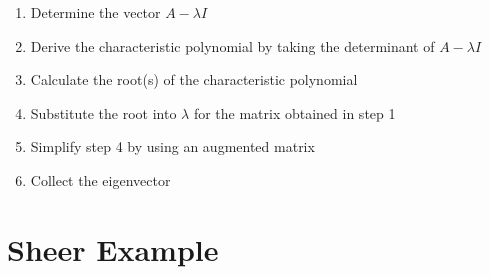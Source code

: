 \documentclass{article}
\begin{document}
	\begin{enumerate}
		\item Determine the vector \(A - \lambda I\)
		\item Derive the characteristic polynomial by taking the determinant of \(A - \lambda I\)
		\item Calculate the root(s) of the characteristic polynomial
		\item Substitute the root into \(\lambda\) for the matrix obtained in step 1
		\item Simplify step 4 by using an augmented matrix
		\item Collect the eigenvector
	\end{enumerate}
	
	\newpage
	\section{Sheer Example}
		
\end{document}
